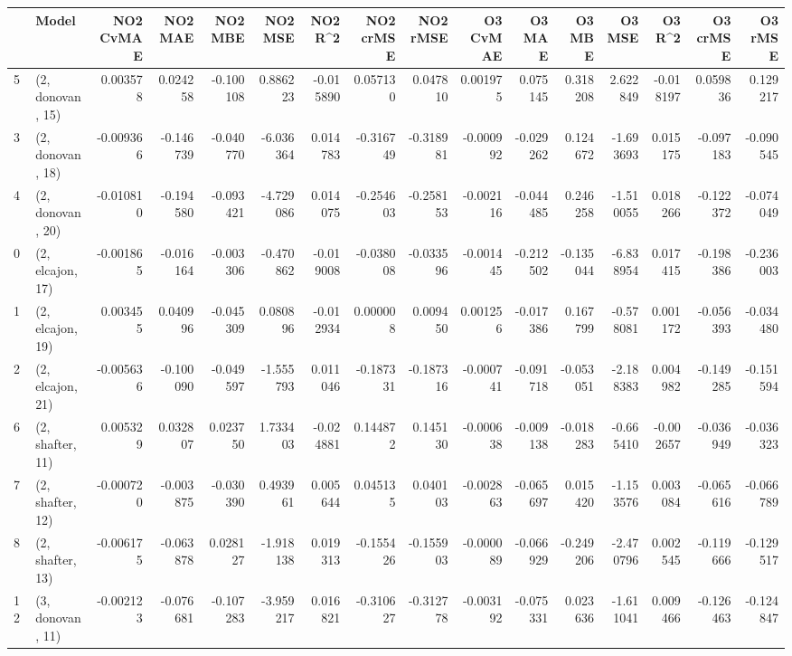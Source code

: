 \begin{tabular}{llrrrrrrrrrrrrrr}
\toprule
{} &             Model &  NO2 CvMAE &   NO2 MAE &   NO2 MBE &    NO2 MSE &   NO2 R\textasciicircum2 &  NO2 crMSE &  NO2 rMSE &  O3 CvMAE &    O3 MAE &    O3 MBE &     O3 MSE &    O3 R\textasciicircum2 &  O3 crMSE &   O3 rMSE \\
\midrule
5  &  (2, donovan, 15) &   0.003578 &  0.024258 & -0.100108 &   0.886223 & -0.015890 &   0.057130 &  0.047810 &  0.001975 &  0.075145 &  0.318208 &   2.622849 & -0.018197 &  0.059836 &  0.129217 \\
3  &  (2, donovan, 18) &  -0.009366 & -0.146739 & -0.040770 &  -6.036364 &  0.014783 &  -0.316749 & -0.318981 & -0.000992 & -0.029262 &  0.124672 &  -1.693693 &  0.015175 & -0.097183 & -0.090545 \\
4  &  (2, donovan, 20) &  -0.010810 & -0.194580 & -0.093421 &  -4.729086 &  0.014075 &  -0.254603 & -0.258153 & -0.002116 & -0.044485 &  0.246258 &  -1.510055 &  0.018266 & -0.122372 & -0.074049 \\
0  &  (2, elcajon, 17) &  -0.001865 & -0.016164 & -0.003306 &  -0.470862 & -0.019008 &  -0.038008 & -0.033596 & -0.001445 & -0.212502 & -0.135044 &  -6.838954 &  0.017415 & -0.198386 & -0.236003 \\
1  &  (2, elcajon, 19) &   0.003455 &  0.040996 & -0.045309 &   0.080896 & -0.012934 &   0.000008 &  0.009450 &  0.001256 & -0.017386 &  0.167799 &  -0.578081 &  0.001172 & -0.056393 & -0.034480 \\
2  &  (2, elcajon, 21) &  -0.005636 & -0.100090 & -0.049597 &  -1.555793 &  0.011046 &  -0.187331 & -0.187316 & -0.000741 & -0.091718 & -0.053051 &  -2.188383 &  0.004982 & -0.149285 & -0.151594 \\
6  &  (2, shafter, 11) &   0.005329 &  0.032807 &  0.023750 &   1.733403 & -0.024881 &   0.144872 &  0.145130 & -0.000638 & -0.009138 & -0.018283 &  -0.665410 & -0.002657 & -0.036949 & -0.036323 \\
7  &  (2, shafter, 12) &  -0.000720 & -0.003875 & -0.030390 &   0.493961 &  0.005644 &   0.045135 &  0.040103 & -0.002863 & -0.065697 &  0.015420 &  -1.153576 &  0.003084 & -0.065616 & -0.066789 \\
8  &  (2, shafter, 13) &  -0.006175 & -0.063878 &  0.028127 &  -1.918138 &  0.019313 &  -0.155426 & -0.155903 & -0.000089 & -0.066929 & -0.249206 &  -2.470796 &  0.002545 & -0.119666 & -0.129517 \\
12 &  (3, donovan, 11) &  -0.002123 & -0.076681 & -0.107283 &  -3.959217 &  0.016821 &  -0.310627 & -0.312778 & -0.003192 & -0.075331 &  0.023636 &  -1.611041 &  0.009466 & -0.126463 & -0.124847 \\

\end{tabular}

